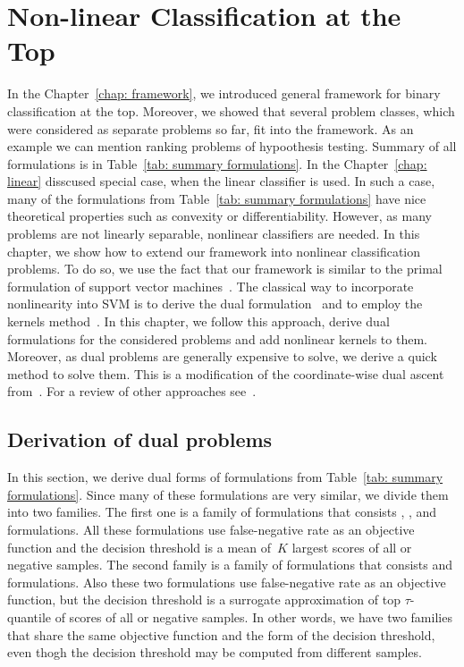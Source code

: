 \chapter{Non-linear Classification at the Top}\label{chap: dual}

In the Chapter~\ref{chap: framework}, we introduced general framework for binary classification at the top. Moreover, we showed that several problem classes, which were considered as separate problems so far, fit into the framework. As an example we can mention ranking problems of hypoothesis testing. Summary of all formulations is in Table~\ref{tab: summary formulations}. In the Chapter~\ref{chap: linear} disscused special case, when the linear classifier is used. In such a case, many of the formulations from Table~\ref{tab: summary formulations} have nice theoretical properties such as convexity or differentiability. However, as many problems are not linearly separable, nonlinear classifiers are needed. In this chapter, we show how to extend our framework into nonlinear classification problems. To do so, we use the fact that our framework is similar to the primal formulation of support vector machines~\cite{cortes1995support}. The classical way to incorporate nonlinearity into SVM is to derive the dual formulation~\cite{boyd2004convex} and to employ the kernels method~\cite{scholkopf2001learning}. In this chapter, we follow this approach, derive dual formulations for the considered problems and add nonlinear kernels to them. Moreover, as dual problems are generally expensive to solve, we derive a quick method to solve them. This is a modification of the coordinate-wise dual ascent from~\cite{hsieh2008dual}. For a review of other approaches see~\cite{batmaz2019review,werner2019review}.

\section{Derivation of dual problems}\label{sec:Derivation of dual problems}

In this section, we derive dual forms of formulations from Table~\ref{tab: summary formulations}. Since many of these formulations are very similar, we divide them into two families. The first one is a family of \TopPushK formulations that consists \TopPush, \TopPushK, \TopMeanK and \tauFPL formulations. All these formulations use false-negative rate as an objective function and the decision threshold is a mean of~$K$ largest scores of all or negative samples. The second family is a family of \PatMat formulations that consists \PatMat and \PatMat formulations. Also these two formulations use false-negative rate as an objective function, but the decision threshold is a surrogate approximation of top $\tau$-quantile of scores of all or negative samples. In other words, we have two families that share the same objective function and the form of the decision threshold, even thogh the decision threshold may be computed from different samples.  

